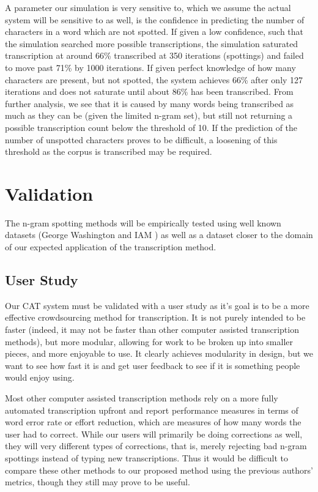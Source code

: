 \documentclass[ms]{byuprop}
\begin{document}
A parameter our simulation is very sensitive to, which we assume the actual system will be sensitive to as well, is the confidence in predicting the number of characters in a word which are not spotted. If given a low confidence, such that the simulation searched more possible transcriptions, the simulation saturated transcription at around 66\% transcribed at 350 iterations (spottings) and failed to move past 71\% by 1000 iterations. If given perfect knowledge of how many characters are present, but not spotted, the system achieves 66\% after only 127 iterations and does not saturate until about 86\% has been transcribed. From further analysis, we see that it is caused by many words being transcribed as much as they can be (given the limited n-gram set), but still not returning a possible transcription count below the threshold of 10. If the prediction of the number of unspotted characters proves to be difficult, a loosening of this threshold as the corpus is transcribed may be required.



\section{Validation}
The n-gram spotting methods will be empirically tested using well known datasets (George Washington \cite{GW} and IAM \cite{IAM}) as well as a dataset closer to the domain of our expected application of the transcription method.

\subsection{User Study}

Our CAT system must be validated with a user study as it's goal is to be a more effective crowdsourcing method for transcription. It is not purely intended to be faster (indeed, it may not be faster than other computer assisted transcription methods), but more modular, allowing for work to be broken up into smaller pieces, and more enjoyable to use. It clearly achieves modularity in design, but we want to see how fast it is and get user feedback to see if it is something people would enjoy using.

Most other computer assisted transcription methods rely on a more fully automated transcription upfront and report performance measures in terms of word error rate or effort reduction, which are measures of how many words the user had to correct. While our users will primarily be doing corrections as well, they will very different types of corrections, that is, merely rejecting bad n-gram spottings instead of typing new transcriptions. Thus it would be difficult to compare these other methods to our proposed method using the previous authors' metrics, though they still may prove to be useful.
\end{document}
